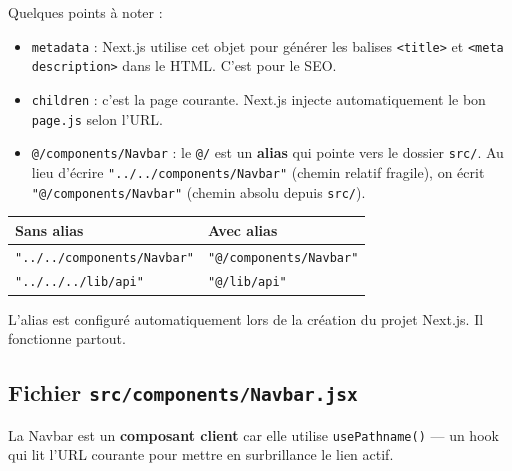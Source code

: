 \documentclass[11pt,a4paper]{article}
\begin{document}
Quelques points à noter :

\begin{itemize}[nosep]
\item \texttt{metadata} : Next.js utilise cet objet pour générer les balises \texttt{<title>} et \texttt{<meta description>} dans le HTML. C'est pour le SEO.
\item \texttt{children} : c'est la page courante. Next.js injecte automatiquement le bon \texttt{page.js} selon l'URL.
\item \texttt{@/components/Navbar} : le \texttt{@/} est un \textbf{alias} qui pointe vers le dossier \texttt{src/}. Au lieu d'écrire \texttt{"../../components/Navbar"} (chemin relatif fragile), on écrit \texttt{"@/components/Navbar"} (chemin absolu depuis \texttt{src/}).
\end{itemize}

\begin{attentionbox}
\begin{center}
\begin{tabular}{ll}
\toprule
\textbf{Sans alias} & \textbf{Avec alias} \\
\midrule
\texttt{"../../components/Navbar"} & \texttt{"@/components/Navbar"} \\
\texttt{"../../../lib/api"} & \texttt{"@/lib/api"} \\
\bottomrule
\end{tabular}
\end{center}
L'alias est configuré automatiquement lors de la création du projet Next.js. Il fonctionne partout.
\end{attentionbox}

\subsection{Fichier \texttt{src/components/Navbar.jsx}}

La Navbar est un \textbf{composant client} car elle utilise \texttt{usePathname()} --- un hook qui lit l'URL courante pour mettre en surbrillance le lien actif.
\end{document}
